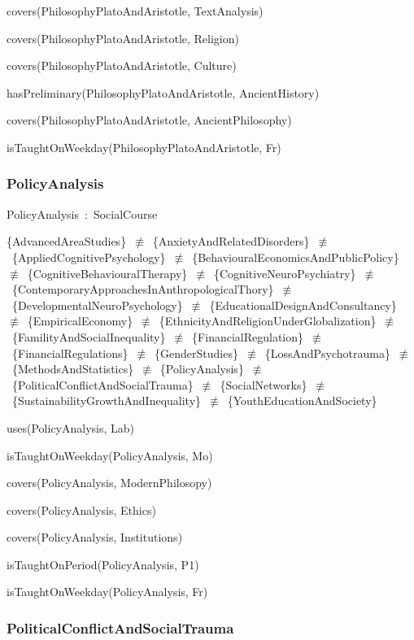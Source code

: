 \documentclass{article}
\begin{document}
covers(PhilosophyPlatoAndAristotle, TextAnalysis)

covers(PhilosophyPlatoAndAristotle, Religion)

covers(PhilosophyPlatoAndAristotle, Culture)

hasPreliminary(PhilosophyPlatoAndAristotle, AncientHistory)

covers(PhilosophyPlatoAndAristotle, AncientPhilosophy)

isTaughtOnWeekday(PhilosophyPlatoAndAristotle, Fr)

\subsubsection*{PolicyAnalysis}

PolicyAnalysis~:~SocialCourse

\{AdvancedAreaStudies\}~\ensuremath{\not\equiv}~\{AnxietyAndRelatedDisorders\}~\ensuremath{\not\equiv}~\{AppliedCognitivePsychology\}~\ensuremath{\not\equiv}~\{BehaviouralEconomicsAndPublicPolicy\}~\ensuremath{\not\equiv}~\{CognitiveBehaviouralTherapy\}~\ensuremath{\not\equiv}~\{CognitiveNeuroPsychiatry\}~\ensuremath{\not\equiv}~\{ContemporaryApproachesInAnthropologicalThory\}~\ensuremath{\not\equiv}~\{DevelopmentalNeuroPsychology\}~\ensuremath{\not\equiv}~\{EducationalDesignAndConsultancy\}~\ensuremath{\not\equiv}~\{EmpiricalEconomy\}~\ensuremath{\not\equiv}~\{EthnicityAndReligionUnderGlobalization\}~\ensuremath{\not\equiv}~\{FamilityAndSocialInequality\}~\ensuremath{\not\equiv}~\{FinancialRegulation\}~\ensuremath{\not\equiv}~\{FinancialRegulations\}~\ensuremath{\not\equiv}~\{GenderStudies\}~\ensuremath{\not\equiv}~\{LossAndPsychotrauma\}~\ensuremath{\not\equiv}~\{MethodsAndStatistics\}~\ensuremath{\not\equiv}~\{PolicyAnalysis\}~\ensuremath{\not\equiv}~\{PoliticalConflictAndSocialTrauma\}~\ensuremath{\not\equiv}~\{SocialNetworks\}~\ensuremath{\not\equiv}~\{SustainabilityGrowthAndInequality\}~\ensuremath{\not\equiv}~\{YouthEducationAndSociety\}

uses(PolicyAnalysis, Lab)

isTaughtOnWeekday(PolicyAnalysis, Mo)

covers(PolicyAnalysis, ModernPhilosopy)

covers(PolicyAnalysis, Ethics)

covers(PolicyAnalysis, Institutions)

isTaughtOnPeriod(PolicyAnalysis, P1)

isTaughtOnWeekday(PolicyAnalysis, Fr)

\subsubsection*{PoliticalConflictAndSocialTrauma}
\end{document}
